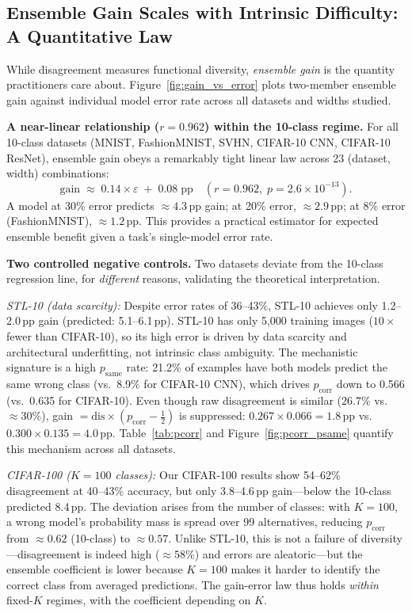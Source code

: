 \documentclass[11pt]{article}
\begin{document}
\subsection{Ensemble Gain Scales with Intrinsic Difficulty: A Quantitative Law}
\label{sec:gain_error}

While disagreement measures functional diversity, \emph{ensemble gain} is the
quantity practitioners care about.  Figure~\ref{fig:gain_vs_error} plots
two-member ensemble gain against individual model error rate across all
datasets and widths studied.

\textbf{A near-linear relationship ($r = 0.962$) within the 10-class regime.}
For all 10-class datasets (MNIST, FashionMNIST, SVHN, CIFAR-10 CNN,
CIFAR-10 ResNet), ensemble gain obeys a remarkably tight linear law across
23 (dataset, width) combinations:
\[
  \text{gain} \;\approx\; 0.14 \times \varepsilon \;+\; 0.08\;\text{pp}
  \quad (r = 0.962,\; p = 2.6 \times 10^{-13}).
\]
A model at 30\% error predicts ${\approx}4.3$\,pp gain; at 20\% error,
${\approx}2.9$\,pp; at 8\% error (FashionMNIST), ${\approx}1.2$\,pp.
This provides a practical estimator for expected ensemble benefit given
a task's single-model error rate.

\textbf{Two controlled negative controls.}  Two datasets deviate from
the 10-class regression line, for \emph{different} reasons, validating
the theoretical interpretation.

\emph{STL-10 (data scarcity):}  Despite error rates of 36--43\%, STL-10
achieves only 1.2--2.0\,pp gain (predicted: 5.1--6.1\,pp).  STL-10 has
only 5,000 training images ($10\times$ fewer than CIFAR-10), so its high
error is driven by data scarcity and architectural underfitting, not
intrinsic class ambiguity.  The mechanistic signature is a high
$p_{\mathrm{same}}$ rate: 21.2\% of examples have both models predict the
same wrong class (vs.\ 8.9\% for CIFAR-10 CNN), which drives $p_{\mathrm{corr}}$ down
to 0.566 (vs.\ 0.635 for CIFAR-10).  Even though raw disagreement is
similar ($26.7\%$ vs.\ ${\approx}30\%$), gain $= \mathrm{dis} \times (p_{\mathrm{corr}} - \tfrac{1}{2})$
is suppressed: $0.267 \times 0.066 = 1.8$\,pp vs.\ $0.300 \times 0.135 = 4.0$\,pp.
Table~\ref{tab:pcorr} and Figure~\ref{fig:pcorr_psame} quantify this mechanism
across all datasets.

\emph{CIFAR-100 ($K\!=\!100$ classes):}  Our CIFAR-100
results show 54--62\% disagreement at 40--43\% accuracy, but only
3.8--4.6\,pp gain---below the 10-class predicted 8.4\,pp.  The deviation
arises from the number of classes: with $K=100$, a wrong model's
probability mass is spread over 99 alternatives, reducing $p_{\mathrm{corr}}$
from ${\approx}0.62$ (10-class) to ${\approx}0.57$.  Unlike STL-10, this
is not a failure of diversity---disagreement is indeed high (${\approx}58\%$)
and errors are aleatoric---but the ensemble coefficient is lower because
$K=100$ makes it harder to identify the correct class from averaged predictions.
The gain-error law thus holds \emph{within} fixed-$K$ regimes, with the
coefficient depending on $K$.
\end{document}
